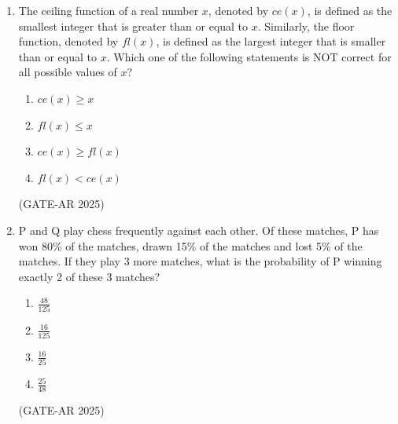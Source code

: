 \documentclass[a4paper,10pt]{article}
\begin{document}
\begin{enumerate}
    \item The ceiling function of a real number $x$, denoted by $ce(x)$, is defined as the smallest integer that is greater than or equal to $x$. Similarly, the floor function, denoted by $fl(x)$, is defined as the largest integer that is smaller than or equal to $x$. Which one of the following statements is NOT correct for all possible values of $x$?
    \begin{enumerate}
        \item $ce(x) \geq x$
        \item $fl(x) \leq x$
        \item $ce(x) \geq fl(x)$
        \item $fl(x) < ce(x)$
    \end{enumerate}
    \hfill (GATE-AR 2025)

    \item P and Q play chess frequently against each other. Of these matches, P has won 80\% of the matches, drawn 15\% of the matches and lost 5\% of the matches. If they play 3 more matches, what is the probability of P winning exactly 2 of these 3 matches?
    \begin{multicols}{4}
    \begin{enumerate}
        \item $\frac{48}{125}$
        \item $\frac{16}{125}$
        \item $\frac{16}{25}$
        \item $\frac{25}{48}$
    \end{enumerate}
    \end{multicols}
    \hfill (GATE-AR 2025)


\end{enumerate}
\end{document}
